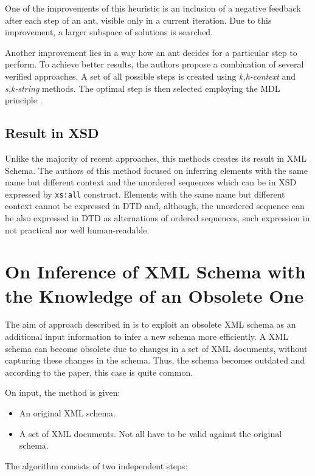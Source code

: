 One of the improvements of this heuristic is an inclusion of a negative feedback after each step of an ant, visible only in a current iteration. Due to this improvement, a larger subspace of solutions is searched.

Another improvement lies in a way how an ant decides for a particular step to perform. To achieve better results, the authors propose a combination of several verified approaches. A set of all possible steps is created using \emph{k,h-context} \cite{ahonen} and \emph{s,k-string} \cite{Raman97thesk-strings, Wong03onstructural} methods. The optimal step is then selected employing the MDL principle \cite{Grünwald05atutorial, Garofalakis:2000:XSE:342009.335409}.

\subsection{Result in XSD}
Unlike the majority of recent approaches, this methods creates its result in XML Schema. The authors of this method focused on inferring elements with the same name but different context and the unordered sequences which can be in XSD expressed by \texttt{xs:all} construct. Elements with the same name but different context cannot be expressed in DTD and, although, the unordered sequence can be also expressed in DTD as alternations of ordered sequences, such expression in not practical nor well human-readable.

\section{On Inference of XML Schema with the Knowledge of an Obsolete One}
The aim of approach described in \cite{Mlynkova:2009:IXS:1862681.1862693} is to exploit an obsolete XML schema as an additional input information to infer a new schema more efficiently. A XML schema can become obsolete due to changes in a set of XML documents, without capturing these changes in the schema. Thus, the schema becomes outdated and according to the paper, this case is quite common.

On input, the method is given:
\begin{itemize}
\item An original XML schema.
\item A set of XML documents. Not all have to be valid against the original schema.
\end{itemize}

The algorithm consists of two independent steps:

